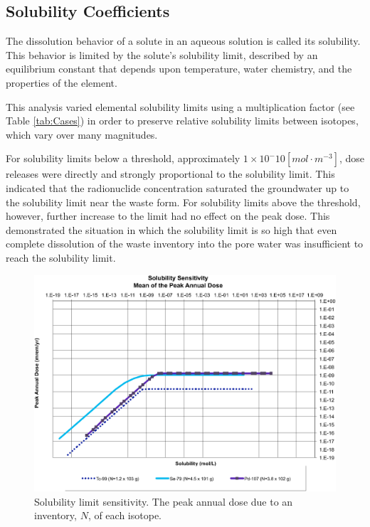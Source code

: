 
\subsection{Solubility Coefficients}

The dissolution behavior of a solute in an aqueous solution is called its 
solubility. This behavior is limited by the solute's solubility limit, described  
by an equilibrium constant that depends upon temperature, water chemistry, and 
the properties of the element. 

This analysis varied elemental solubility limits using a multiplication factor 
(see Table \ref{tab:Cases}) in order to preserve relative solubility limits 
between isotopes, which vary over many magnitudes.

For solubility limits below a threshold, approximately 
$1\times10^-{10}[mol\cdot m^{-3}]$, dose releases were directly 
and strongly proportional to the solubility limit. This indicated that the radionuclide 
concentration saturated the groundwater up to the solubility limit near the 
waste form.  For solubility limits above the threshold, however, further 
increase to the limit had no effect on the peak dose. This demonstrated the 
situation in which the solubility limit is so high that even complete 
dissolution of the waste inventory into the pore water was insufficient to reach 
the solubility limit.

\begin{figure}[ht]
  \centering
  \includegraphics[width=\linewidth]{Solubility_Summary.eps}
  \caption{Solubility limit sensitivity. The peak annual dose due to an 
  inventory, 
  $N$, of each isotope.}
  \label{fig:SolSum}
\end{figure}
